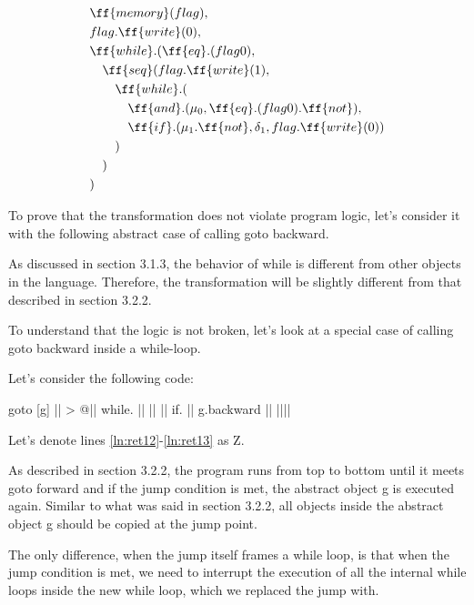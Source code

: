 \documentclass[sigplan,review,11pt,nonacm,natbib=false]{acmart}
\begin{document}
\hline

\begin{equation} \nonumber
\begin{split}
& \ff{memory}(flag), \\
& flag.\ff{write}(0), \\
& \ff{while}.(\ff{eq}.(flag 0), \\
& \quad \ff{seq}(flag.\ff{write}(1), \\
& \quad \quad \ff{while}.( \\
& \quad \quad \quad \ff{and}.(\mu_0, \ff{eq}.(flag 0).\ff{not}), \\
& \quad \quad \quad \ff{if}.( \mu_1.\ff{not}, \delta_1, flag.\ff{write}(0) ) \\
& \quad \quad ) \\
& \quad ) \\
&  ) \\
\end{split}
\end{equation}

To prove that the transformation does not violate program logic, let's consider it with the following abstract case of calling goto backward.

As discussed in section 3.1.3, the behavior of while is different from other objects in the language. Therefore, the transformation will be slightly different from that described in section 3.2.2.

To understand that the logic is not broken, let's look at a special case of calling goto backward inside a while-loop.

Let's consider the following code:

\begin{ffcode}
goto
  [g]
    || > @|$\label{ln:ret12}$|
      while.
        ||
        ||
          ||
          if.
            ||
            g.backward
            ||
          |||$\label{ln:ret13}$|
        
\end{ffcode}

Let's denote lines \ref{ln:ret12}-\ref{ln:ret13} as Z.

As described in section 3.2.2, the program runs from top to bottom until it meets goto forward and if the jump condition is met, the abstract object g is executed again.
Similar to what was said in section 3.2.2, all objects inside the abstract object g should be copied at the jump point.

The only difference, when the jump itself frames a while loop, is that when the jump condition is met, we need to interrupt the execution of all the internal while loops inside the new while loop, which we replaced the jump with.
\end{document}
